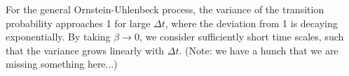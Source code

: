\documentclass[english, parskip=full]{scrartcl}
\begin{document}
For the general Ornstein-Uhlenbeck process, the variance of the transition probability approaches 1 for large $\Delta t$, where the deviation from 1 is decaying exponentially.
By taking $\beta\rightarrow 0$, we consider sufficiently short time scales, such that the variance grows linearly with $\Delta t$.
(Note: we have a hunch that we are missing something here...)

\end{document}
